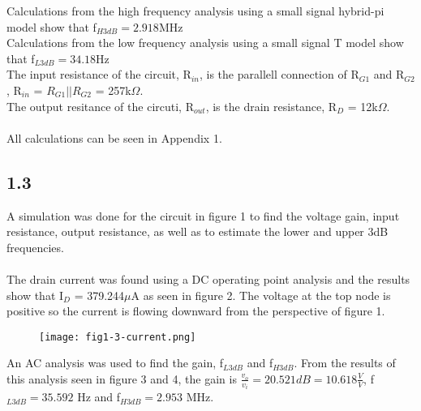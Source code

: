   Calculations from the high frequency analysis using a small signal hybrid-pi model show that f$_{H 3dB} = 2.918$MHz\\

  Calculations from the low frequency analysis using a small signal T model show that f$_{L 3dB} = 34.18$Hz\\

  The input resistance of the circuit, R$_{in}$, is the parallell connection of R$_{G1}$ and R$_{G2}$, R$_{in}$ = $R_{G1}||R_{G2}$ = 257k$\Omega$.\\
  The output resitance of the circuti, R$_{out}$, is the drain resistance, R$_D$ = 12k$\Omega$.\\\\

  All calculations can be seen in Appendix 1.\\
\pagebreak
\subsection*{1.3}

  A simulation was done for the circuit in figure 1 to find the voltage gain, input resistance, output resistance, as well as to estimate the lower and upper 3dB frequencies.\\\\

  The drain current was found using a DC operating point analysis and the results show that I$_D$ = 379.244$\mu$A as seen in figure 2. The voltage at the top node is positive so the current is flowing downward from the perspective of figure 1.\\

  \begin{figure}[h!]
        \centering
        \texttt{[image: fig1-3-current.png]}
  \end{figure}

\pagebreak

  An AC analysis was used to find the gain, f$_{L 3dB}$ and f$_{H 3dB}$. From the results of this analysis seen in figure 3 and 4, the gain is $\frac{v_o}{v_i} = 20.521 dB = 10.618 \frac{V}{V}$, f$_{L 3dB} = 35.592$ Hz and f$_{H 3dB} = 2.953$ MHz.\\

